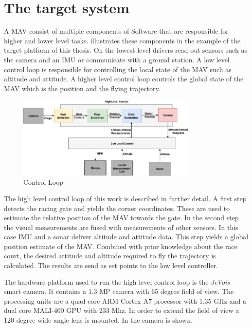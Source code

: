 \section{The target system}

A \ac{MAV} consist of multiple components of Software that are responsible for higher and lower level tasks.  illustrates these components in the example of the target platform of this thesis. On the lowest level drivers read out sensors such as the camera and an \ac{IMU} or communicate with a ground station. A low level control loop is responsible for controlling the local state of the \ac{MAV} such as altitude and attitude. A higher level control loop controls the global state of the \ac{MAV} which is the position and the flying trajectory.


\begin{figure}[hbtp]
	\centering
	\includegraphics[width=0.8\textwidth]{fig/control_loop}
	\caption{Control Loop}
	\label{fig:control_loop}
\end{figure}

The high level control loop of this work is described in further detail. A first step detects the racing gate and yields the corner coordinates. These are used to estimate the relative position of the \ac{MAV} towards the gate. In the second step the visual measurements are fused with measurements of other sensors. In this case \ac{IMU} and a sonar deliver altitude and attitude data. This step yields a global position estimate of the \ac{MAV}. Combined with prior knowledge about the race court, the desired attitude and altitude required to fly the trajectory is calculated. The results are send as set points to the low level controller.

The hardware platform used to run the high level control loop is the \textit{JeVois} smart camera. It contains a 1.3 MP camera with 65 degree field of view. The processing units are a quad core ARM Cortex A7 processor with 1.35 GHz and a dual core MALI-400 GPU with 233 Mhz. In order to extend the field of view a 120 degree wide angle lens is mounted. In  the camera is shown.

